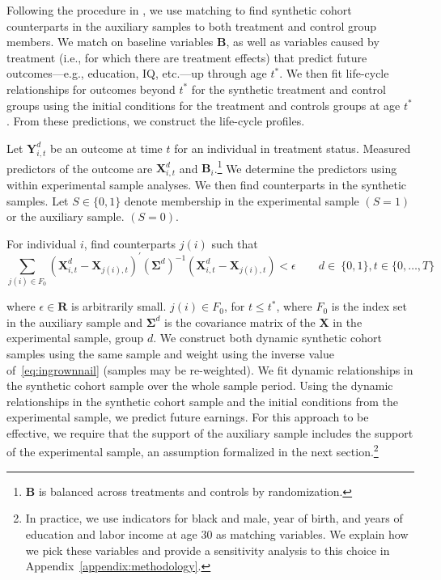 Following the procedure in \citet{Heckman_Ichimura_etal_1998_REStud}, we use matching to find synthetic cohort counterparts in the auxiliary samples to both treatment and control group members. We match on baseline variables $\bm{B}$, as well as variables caused by treatment (i.e., for which there are treatment effects) that predict future outcomes---e.g., education, IQ, etc.---up through age $t^{\ast}$. We then fit life-cycle relationships for outcomes beyond $t^{\ast}$ for the synthetic treatment and control groups using the initial conditions for the treatment and controls groups at age $t^{\ast}$. From these predictions, we construct the life-cycle profiles.

Let $\bm{Y}^{d}_{i,t}$ be an outcome at time $t$ for an individual in treatment status. Measured predictors of the outcome are $\bm{X}^{d}_{i,t}$ and $\bm{B}_i$.\footnote{$\bm{B}$ is balanced across treatments and controls by randomization.} We determine the predictors using within experimental sample analyses. We then find counterparts in the synthetic samples. Let $S \in \{ 0,1\}$ denote membership in the experimental sample $(S=1)$ or the auxiliary sample. $(S=0)$.

For individual $i$, find counterparts $j(i)$ such that
\begin{equation}\label{eq:ingrownnail}
\sum_{j(i)\in F_0} \left( \bm{X}^{d}_{i,t} - \bm{X}_{j(i),t} \right)^{\prime} {\left( \bm{\Sigma}^d\right)}^{-1} \left(\bm{X}^{d}_{i,t} - \bm{X}_{j(i),t} \right) < \epsilon \qquad d \in \ \{0,1\}, t \in \{0,\dots,T\}
\end{equation}

\noindent where $\epsilon \in \mathbf{R}$ is arbitrarily small. $j(i) \in F_0$, for $t \leq t^{\ast}$, where $F_0$ is the index set in the auxiliary sample and $\bm{\Sigma}^d$ is the covariance matrix of the $\bm{X}$ in the experimental sample, group $d$. We construct both dynamic synthetic cohort samples using the same sample and weight using the inverse value of~\eqref{eq:ingrownnail} (samples may be re-weighted). We fit dynamic relationships in the synthetic cohort sample over the whole sample period. Using the dynamic relationships in the synthetic cohort sample and the initial conditions from the experimental sample, we predict future earnings. For this approach to be effective, we require that the support of the auxiliary sample includes the support of the experimental sample, an assumption formalized in the next section.\footnote{In practice, we use indicators for black and male, year of birth, and years of education and labor income at age 30 as matching variables. We explain how we pick these variables and provide a sensitivity analysis to this choice in Appendix~\ref{appendix:methodology}.}

